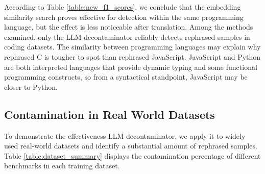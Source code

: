 According to Table \ref{table:new_f1_scores}, we conclude that the embedding similarity search proves effective for detection within the same programming language, but the effect is less noticeable after translation.
Among the methods examined, only the LLM decontaminator reliably detects rephrased samples in coding datasets.
The similarity between programming languages may explain why rephrased C is tougher to spot than rephrased JavaScript. JavaScript and Python are both interpreted languages that provide dynamic typing and some functional programming constructs, so from a syntactical standpoint, JavaScript may be closer to Python.



\subsection{Contamination in Real World Datasets}
\label{sec:real-world}


To demonstrate the effectiveness LLM decontaminator, we apply it to widely used real-world datasets and identify a substantial amount of rephrased samples. 
Table \ref{table:dataset_summary} displays the contamination percentage of different benchmarks in each training dataset.



